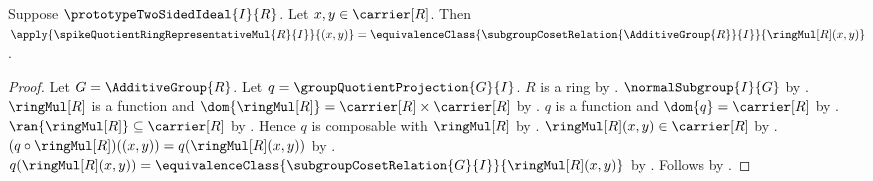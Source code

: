 \begin{proposition}\label{spike_quotient_ring_representative_mul_apply}
    Suppose $\prototypeTwoSidedIdeal{I}{R}$.
    Let $x,y\in\carrier[R]$.
    Then
        $\apply{\spikeQuotientRingRepresentativeMul{R}{I}}{(x,y)}
            =\equivalenceClass{
                \subgroupCosetRelation{\AdditiveGroup{R}}{I}}
                {\ringMul[R](x,y)}$.
\end{proposition}
\begin{proof}
    Let $G=\AdditiveGroup{R}$.
    Let $q=\groupQuotientProjection{G}{I}$.
    $R$ is a ring by .
    $\normalSubgroup{I}{G}$ by
        .
    $\ringMul[R]$ is a function and
        $\dom{\ringMul[R]}=\carrier[R]\times\carrier[R]$ by
        .
    $q$ is a function and $\dom{q}=\carrier[R]$ by
        .
    $\ran{\ringMul[R]}\subseteq\carrier[R]$ by
        .
    Hence $q$ is composable with $\ringMul[R]$ by \auto.
    $\ringMul[R](x,y)\in\carrier[R]$ by .
    $(q\circ\ringMul[R])((x,y))=q(\ringMul[R](x,y))$ by
        .
    $q(\ringMul[R](x,y))=
        \equivalenceClass{
            \subgroupCosetRelation{G}{I}}{\ringMul[R](x,y)}$ by
        .
    Follows by .
\end{proof}

